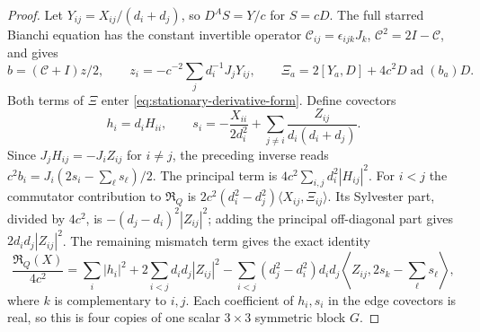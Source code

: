\documentclass[11pt]{article}
\numberwithin{equation}{section}
\theoremstyle{definition}
\theoremstyle{remark}
\begin{document}
\begin{proof}
Let $Y_{ij}=X_{ij}/(d_i+d_j)$, so $D^AS=Y/c$ for $S=cD$.
The full starred Bianchi equation has the constant invertible
operator $\mathscr C_{ij}=\epsilon_{ijk}J_k$,
$\mathscr C^2=2I-\mathscr C$, and gives
\[
 b=(\mathscr C+I)z/2,\qquad
 z_i=-c^{-2}\sum_jd_i^{-1}J_jY_{ij},\qquad
 \Xi_a=2[Y_a,D]+4c^2D\operatorname{ad}(b_a)D.
\]
Both terms of $\Xi$ enter \eqref{eq:stationary-derivative-form}.
Define covectors
\[
 h_i=d_iH_{ii},\qquad
 s_i=-\frac{X_{ii}}{2d_i^2}
       +\sum_{j\ne i}\frac{Z_{ij}}{d_i(d_i+d_j)}.
\]
Since $J_jH_{ij}=-J_iZ_{ij}$ for $i\ne j$, the preceding
inverse reads $c^2b_i=J_i(2s_i-\sum_\ell s_\ell)/2$.
The principal term is $4c^2\sum_{i,j}d_i^2|H_{ij}|^2$.
For $i<j$ the commutator contribution to
$\mathfrak R_Q$ is
$2c^2(d_i^2-d_j^2)\langle X_{ij},\Xi_{ij}\rangle$.
Its Sylvester part, divided by $4c^2$, is
$-(d_j-d_i)^2|Z_{ij}|^2$; adding the principal off-diagonal
part gives $2d_id_j|Z_{ij}|^2$. The remaining mismatch term
gives the exact identity
\begin{equation}\label{eq:stationary-scalar-block}
 \frac{\mathfrak R_Q(X)}{4c^2}
 =\sum_i|h_i|^2+2\sum_{i<j}d_id_j|Z_{ij}|^2
  -\sum_{i<j}(d_j^2-d_i^2)d_id_j
      \left\langle Z_{ij},2s_k-\sum_\ell s_\ell\right\rangle,
\end{equation}
where $k$ is complementary to $i,j$. Each coefficient of
$h_i,s_i$ in the edge covectors is real, so this is four
copies of one scalar $3\times3$ symmetric block $G$.


\end{proof}
\end{document}
